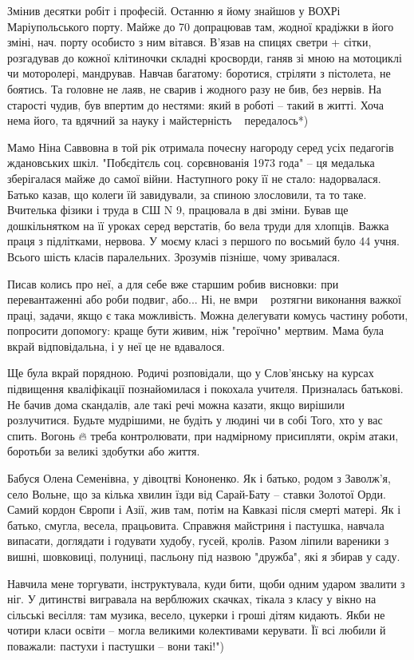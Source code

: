 Змінив десятки робіт і професій. Останню я йому знайшов у ВОХРі Маріупольського
порту. Майже до 70 допрацював там, жодної крадіжки в його зміні, нач. порту
особисто з ним вітався. В'язав на спицях светри + сітки, розгадував до кожної
клітиночки складні кросворди, ганяв зі мною на мотоциклі чи моторолері,
мандрував. Навчав багатому: боротися, стріляти з пістолета, не боятись. Та
головне не лаяв, не сварив і жодного разу не бив, без нервів. На старості
чудив, був впертим до нестями: який в роботі – такий в житті. Хоча нема його,
та вдячний за науку і майстерність ~ передалось*)

Мамо Ніна Саввовна в той рік отримала почесну нагороду серед усіх педагогів
ждановських шкіл. "Побєдітєль соц. сорєвнованія 1973 года" – ця медалька
зберігалася майже до самої війни. Наступного року її не стало: надорвалася.
Батько казав, що колеги їй завидували, за спиною злословили, та то таке.
Вчителька фізики і труда в СШ N 9, працювала в дві зміни. Бував ще
дошкільнятком на її уроках серед верстатів, бо вела труди для хлопців. Важка
праця з підлітками, нервова. У моєму класі з першого по восьмий було 44 учня.
Всього шість класів паралельних. Зрозумів пізніше, чому зривалася. 

Писав колись про неї, а для себе вже старшим робив висновки: при перевантаженні
або роби подвиг, або... Ні, не вмри ~ розтягни виконання важкої праці, задачи,
якщо є така можливість. Можна делегувати комусь частину роботи, попросити
допомогу: краще бути живим, ніж "героїчно" мертвим. Мама була вкрай
відповідальна, і у неї це не вдавалося. 

Ще була вкрай порядною. Родичі розповідали, що у Слов'янську на курсах
підвищення кваліфікації познайомилася і покохала учителя. Призналась батькові.
Не бачив дома скандалів, але такі речі можна казати, якщо вирішили розлучитися.
Будьте мудрішими, не будіть у людині чи в собі Того, хто у вас спить. Вогонь 🔥
треба контролювати, при надмірному присипляти, окрім атаки, боротьби за великі
здобутки або життя.

Бабуся Олена Семенівна, у дівоцтві Кононенко. Як і батько, родом з Заволж'я,
село Вольне, що за кілька хвилин їзди від Сарай-Бату – ставки Золотої Орди.
Самий кордон Європи і Азії, жив там, потім на Кавказі після смерті матері. Як і
батько, смугла, весела, працьовита. Справжня майстриня і пастушка, навчала
випасати, доглядати і годувати худобу, гусей, кролів. Разом ліпили вареники з
вишні, шовковиці, полуниці, пасльону під назвою "дружба", які я збирав у саду. 

Навчила мене торгувати, інструктувала, куди бити, щоби одним ударом звалити з
ніг. У дитинстві вигравала на верблюжих скачках, тікала з класу у вікно на
сільські весілля: там музика, весело, цукерки і гроші дітям кидають. Якби не
чотири класи освіти – могла великими колективами керувати. Її всі любили й
поважали: пастухи і пастушки – вони такі!")

